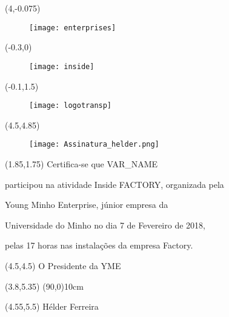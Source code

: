 \documentclass{article}
\begin{document}
\begin{textblock}{20}(4,-0.075)
\begin{figure}
    \texttt{[image: enterprises]}
\end{figure}
\end{textblock}

\begin{textblock}{10}(-0.3,0)
\begin{figure}
    \texttt{[image: inside]}
\end{figure}
\end{textblock}

\begin{textblock}{10}(-0.1,1.5)
\begin{figure}
    \texttt{[image: logotransp]}
\end{figure}
\end{textblock}

\begin{textblock}{20}(4.5,4.85)
\begin{figure}
    \texttt{[image: Assinatura\_helder.png]}
\end{figure}
\end{textblock}



\begin{textblock}{7}(1.85,1.75)
\LARGE \center
   Certifica-se que VAR_NAME

   participou na atividade Inside FACTORY, organizada pela

   Young Minho Enterprise, júnior empresa da

      Universidade do Minho no dia 7 de Fevereiro de 2018,

   pelas 17 horas nas instalações da empresa Factory.
\end{textblock}

\begin{textblock}{2}(4.5,4.5)
O Presidente da YME
\end{textblock}

\begin{textblock}{20}(3.8,5.35)
\line(90,0){10cm}
\end{textblock}

\begin{textblock}{2}(4.55,5.5)
\huge Hélder Ferreira
\end{textblock}
\end{document}
